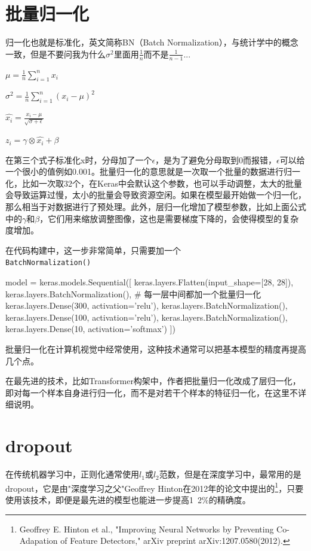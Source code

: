 \documentclass[a5paper, 11pt, openany]{book}
\begin{document}
\section{批量归一化}

归一化也就是标准化，英文简称BN（Batch Normalization），与统计学中的概念一致，但是不要问我为什么$\sigma^2$里面用$\frac{1}{n}$而不是$\frac{1}{n-1}$...

$\mu = \frac{1}{n}\sum^{n}_{i=1}x_i$ 

$\sigma^2 = \frac{1}{n}\sum^{n}_{i=1}(x_i-\mu)^2$

$\hat{x_i} = \frac{x_i-\mu}{\sqrt{\sigma+\epsilon}}$ 

$z_i = \gamma\otimes\hat{x_i}+\beta$

在第三个式子标准化x时，分母加了一个$\epsilon$，是为了避免分母取到0而报错，$\epsilon$可以给一个很小的值例如0.001。批量归一化的意思就是一次取一个批量的数据进行归一化，比如一次取32个，在Keras中会默认这个参数，也可以手动调整，太大的批量会导致运算过慢，太小的批量会导致资源空闲。如果在模型最开始做一个归一化，那么相当于对数据进行了预处理。此外，层归一化增加了模型参数，比如上面公式中的$\gamma$和$\beta$，它们用来缩放调整图像，这也是需要梯度下降的，会使得模型的复杂度增加。

在代码构建中，这一步非常简单，只需要加一个\\
\verb|BatchNormalization()|

\begin{python}
model = keras.models.Sequential([
    keras.layers.Flatten(input_shape=[28, 28]),
    keras.layers.BatchNormalization(),  
    # 每一层中间都加一个批量归一化
    keras.layers.Dense(300, activation='relu'),
    keras.layers.BatchNormalization(),
    keras.layers.Dense(100, activation='relu'),
    keras.layers.BatchNormalization(),
    keras.layers.Dense(10, activation='softmax')
])
\end{python}

批量归一化在计算机视觉中经常使用，这种技术通常可以把基本模型的精度再提高几个点。

在最先进的技术，比如Transformer构架中，作者把批量归一化改成了层归一化，即对每一个样本自身进行归一化，而不是对若干个样本的特征归一化，在这里不详细说明。

\section{dropout}

在传统机器学习中，正则化通常使用$l_1$或$l_2$范数，但是在深度学习中，最常用的是dropout，它是由"深度学习之父"Geoffrey Hinton在2012年的论文中提出的\footnote{Geoffrey E. Hinton et al., "Improving Neural Networks by Preventing Co-Adapation of Feature Detectors," arXiv preprint arXiv:1207.0580(2012).}，只要使用该技术，即便是最先进的模型也能进一步提高1~2\%的精确度。
\end{document}
